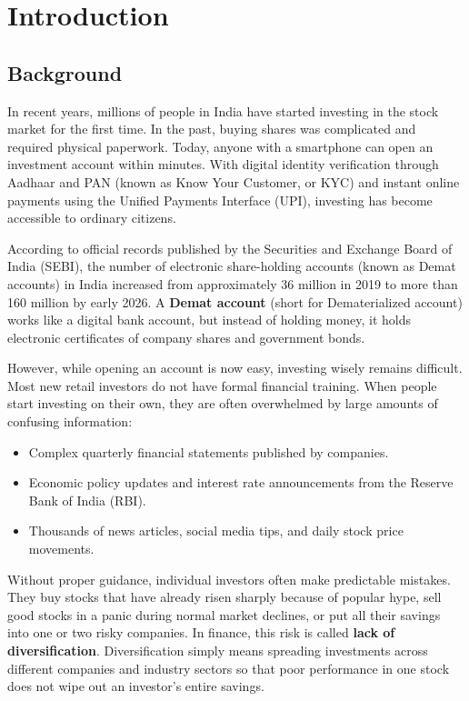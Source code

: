 \chapter{Introduction}

\section{Background}
In recent years, millions of people in India have started investing in the stock market for the first time. In the past, buying shares was complicated and required physical paperwork. Today, anyone with a smartphone can open an investment account within minutes. With digital identity verification through Aadhaar and PAN (known as Know Your Customer, or KYC) and instant online payments using the Unified Payments Interface (UPI), investing has become accessible to ordinary citizens. 

According to official records published by the Securities and Exchange Board of India (SEBI), the number of electronic share-holding accounts (known as Demat accounts) in India increased from approximately 36 million in 2019 to more than 160 million by early 2026. A \textbf{Demat account} (short for Dematerialized account) works like a digital bank account, but instead of holding money, it holds electronic certificates of company shares and government bonds.

However, while opening an account is now easy, investing wisely remains difficult. Most new retail investors do not have formal financial training. When people start investing on their own, they are often overwhelmed by large amounts of confusing information:
\begin{itemize}
    \item Complex quarterly financial statements published by companies.
    \item Economic policy updates and interest rate announcements from the Reserve Bank of India (RBI).
    \item Thousands of news articles, social media tips, and daily stock price movements.
\end{itemize}

Without proper guidance, individual investors often make predictable mistakes. They buy stocks that have already risen sharply because of popular hype, sell good stocks in a panic during normal market declines, or put all their savings into one or two risky companies. In finance, this risk is called \textbf{lack of diversification}. Diversification simply means spreading investments across different companies and industry sectors so that poor performance in one stock does not wipe out an investor's entire savings.

